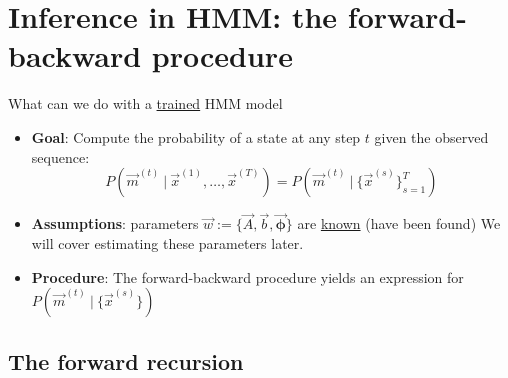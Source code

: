 \section{Inference in HMM: the forward-backward procedure}

\begin{frame} 
    \begin{center}
    What can we do with a \underline{trained} HMM model
    \end{center}
	
\end{frame}

\begin{frame}

\begin{itemize}
\item[] \textbf{Goal}: Compute the probability of a state at any step $t$ given the observed sequence:
\begin{equation}
P(\vec{m}^{(t)}  ~|~ \vec{x}^{(1)},  \ldots,\vec{x}^{(T)}) =
		P(\vec{m}^{(t)}  ~|~ \{\vec{x}^{(s)}\}_{s=1}^{T})
\end{equation}

\item[] \textbf{Assumptions}: parameters $\vec{w} := \{
		\vec{A},
		\vec{b},
		\vec{\boldsymbol{\phi}}
		\}$ are \underline{known} (have been found) We will cover estimating these parameters later.
\item[] \textbf{Procedure}: The forward-backward procedure yields an expression for $P(\vec{m}^{(t)}  ~|~ \{\vec{x}^{(s)}\})$

\end{itemize}

\end{frame}

\subsection{The forward recursion}

